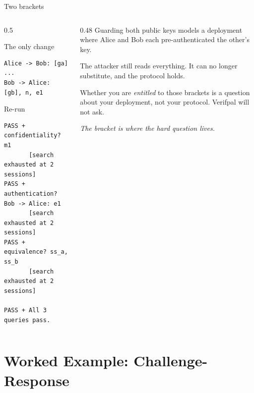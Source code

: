 \ifdefined\PRESENTATION\else\PassOptionsToClass{handout}{beamer}\fi\documentclass[aspectratio=169, lualatex]{beamer}
\newcommand{\vpcode}{\fontsize{6}{6.4}\selectfont\ttfamily\color{vpink}}
\begin{document}
\begin{frame}[fragile]{Two brackets}
	\begin{columns}[t]
		\begin{column}{0.5\textwidth}
			\begin{vpmodel}{The only change}
				\begin{lstlisting}
Alice -> Bob: [ga]
...
Bob -> Alice: [gb], n, e1
\end{lstlisting}
			\end{vpmodel}
			\vspace{0.5em}
			\begin{vpresult}{Re-run}
				\begin{lstlisting}[basicstyle=\vpcode]
PASS + confidentiality? m1
       [search exhausted at 2 sessions]
PASS + authentication? Bob -> Alice: e1
       [search exhausted at 2 sessions]
PASS + equivalence? ss_a, ss_b
       [search exhausted at 2 sessions]

PASS + All 3 queries pass.
\end{lstlisting}
			\end{vpresult}
		\end{column}
		\begin{column}{0.48\textwidth}
			\vspace{0.4em}
			Guarding both public keys models a deployment where Alice and Bob each pre-authenticated the other's key.
			\vspace{0.4em}

			The attacker still reads everything. It can no longer substitute, and the protocol holds.
			\vspace{0.4em}

			Whether you are \textit{entitled} to those brackets is a question about your deployment, not your protocol. Verifpal will not ask.

			\begin{center}
				\textit{The bracket is where the hard question lives.}
			\end{center}
		\end{column}
	\end{columns}
\end{frame}

\section{Worked Example: Challenge-Response}
\end{document}
